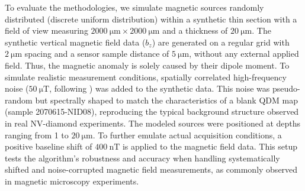 \documentclass[onecolumn,12pt,a4paper]{article}
\begin{document}
To evaluate the methodologies, we simulate magnetic sources randomly distributed (discrete uniform distribution) within a synthetic thin section with a field of view measuring \( \qty{2000}{\micro\meter} \times \qty{2000}{\micro\meter} \) and a thickness of \( \qty{20}{\micro\meter} \). The synthetic vertical magnetic field data (\(b_z\)) are generated on a regular grid with \(\qty{2}{\micro\meter}\) spacing and a sensor sample distance of \(\qty{5}{\micro\meter}\), without any external applied field. Thus, the magnetic anomaly is solely caused by their dipole moment. To simulate realistic measurement conditions, spatially correlated high-frequency noise (\(\qty{50}{\micro\tesla}\), following \citet{Glenn2017}) was added to the synthetic data. This noise was pseudo-random but spectrally shaped to match the characteristics of a blank QDM map (sample 2070615-NID08), reproducing the typical background structure observed in real NV-diamond experiments. The modeled sources were positioned at depths ranging from 1 to \(\qty{20}{\micro\meter}\). To further emulate actual acquisition conditions, a positive baseline shift of \(\qty{400}{\nano\tesla}\) \citep[following][]{Hess2024} is applied to the magnetic field data. This setup tests the algorithm's robustness and accuracy when handling systematically shifted and noise-corrupted magnetic field measurements, as commonly observed in magnetic microscopy experiments.
\end{document}
